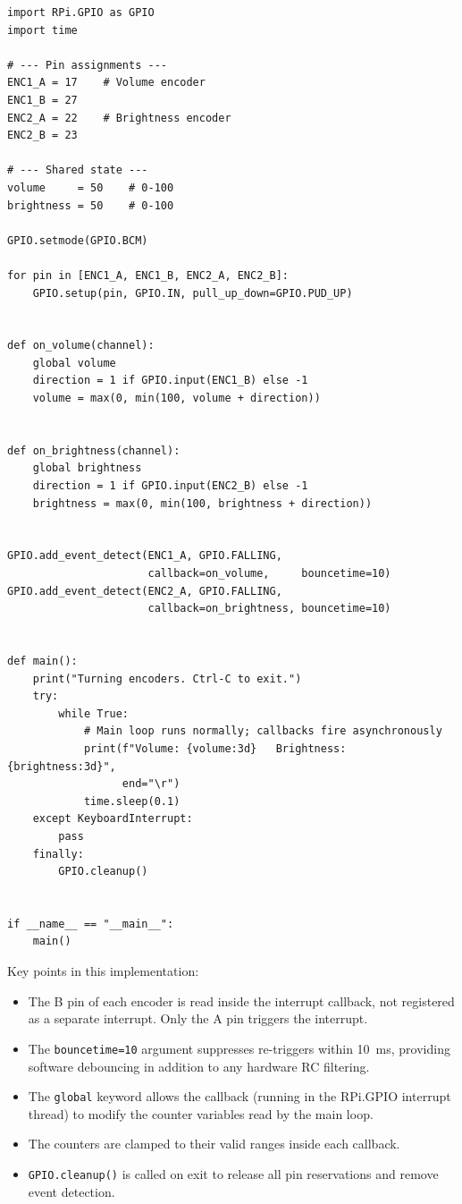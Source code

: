 \begin{verbatim}
import RPi.GPIO as GPIO
import time

# --- Pin assignments ---
ENC1_A = 17    # Volume encoder
ENC1_B = 27
ENC2_A = 22    # Brightness encoder
ENC2_B = 23

# --- Shared state ---
volume     = 50    # 0-100
brightness = 50    # 0-100

GPIO.setmode(GPIO.BCM)

for pin in [ENC1_A, ENC1_B, ENC2_A, ENC2_B]:
    GPIO.setup(pin, GPIO.IN, pull_up_down=GPIO.PUD_UP)


def on_volume(channel):
    global volume
    direction = 1 if GPIO.input(ENC1_B) else -1
    volume = max(0, min(100, volume + direction))


def on_brightness(channel):
    global brightness
    direction = 1 if GPIO.input(ENC2_B) else -1
    brightness = max(0, min(100, brightness + direction))


GPIO.add_event_detect(ENC1_A, GPIO.FALLING,
                      callback=on_volume,     bouncetime=10)
GPIO.add_event_detect(ENC2_A, GPIO.FALLING,
                      callback=on_brightness, bouncetime=10)


def main():
    print("Turning encoders. Ctrl-C to exit.")
    try:
        while True:
            # Main loop runs normally; callbacks fire asynchronously
            print(f"Volume: {volume:3d}   Brightness: {brightness:3d}",
                  end="\r")
            time.sleep(0.1)
    except KeyboardInterrupt:
        pass
    finally:
        GPIO.cleanup()


if __name__ == "__main__":
    main()
\end{verbatim}

\noindent Key points in this implementation:

\begin{itemize}
    \item The B pin of each encoder is read inside the interrupt callback, not
    registered as a separate interrupt. Only the A pin triggers the interrupt.
    \item The \texttt{bouncetime=10} argument suppresses re-triggers within
    \SI{10}{\milli\second}, providing software debouncing in addition to any
    hardware RC filtering.
    \item The \texttt{global} keyword allows the callback (running in the RPi.GPIO
    interrupt thread) to modify the counter variables read by the main loop.
    \item The counters are clamped to their valid ranges inside each callback.
    \item \texttt{GPIO.cleanup()} is called on exit to release all pin reservations
    and remove event detection.
\end{itemize}

